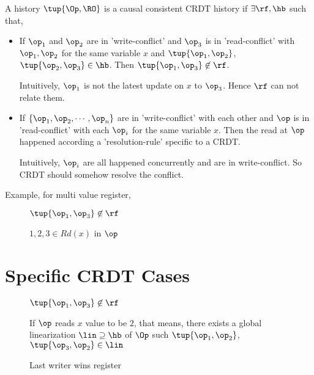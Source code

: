A history $\tup{\Op, \RO}$ is a causal consistent CRDT history if $\exists \rf, \hb$ such that,

\begin{itemize}
 \item If $\op_1$ and $\op_2$ are in 'write-conflict' and $\op_3$ is in 'read-conflict' with $\op_1, \op_2$ for the same variable $x$ and $\tup{\op_1, \op_2}$, $\tup{\op_2, \op_3} \in \hb$. Then $\tup{\op_1, \op_3} \not\in \rf$.

       Intuitively, $\op_1$ is not the latest update on $x$ to $\op_3$. Hence $\rf$ can not relate them.

 \item If $\{\op_1, \op_2, \cdots, \op_n\}$ are in 'write-conflict' with each other and $\op$ is in 'read-conflict' with each $\op_i$ for the same variable $x$.
       Then the read at $\op$ happened according a 'resolution-rule' specific to a CRDT.

       Intuitively, $\op_i$ are all happened concurrently and are in write-conflict. So CRDT should somehow resolve the conflict.
\end{itemize}

Example, for multi value register,
\begin{figure}[ht]
  \centering
  \begin{minipage}{.45\textwidth}
    
    \caption{$\tup{\op_1, \op_3} \not\in \rf$}
    \label{mvreg_eg:a}
  \end{minipage}
  \begin{minipage}{.45\textwidth}
    
    \caption{$1, 2, 3 \in Rd(x)$ in $\op$}
    \label{mvreg_eg:b}
  \end{minipage}
\end{figure}


\section{Specific CRDT Cases}

\begin{figure}[ht]
  \centering
  \begin{minipage}{.45\textwidth}
    
    \caption{$\tup{\op_1, \op_3} \not\in \rf$}
    \label{lwwreg:a}
  \end{minipage}
  \begin{minipage}{.45\textwidth}
    
    \caption{If $\op$ reads $x$ value to be $2$, that means, there exists a global linearization $\lin \supseteq \hb$ of $\Op$ such $\tup{\op_1, \op_2}$, $\tup{\op_3, \op_2} \in \lin$}
    \label{lwwreg:b}
  \end{minipage}
  \caption{Last writer wins register}
\end{figure}


